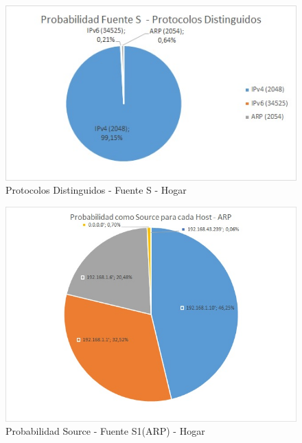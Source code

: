 \begin{figure}[h!]
\centering
\includegraphics[width=\textwidth]{./img/probaS_casa.jpg}
\caption{Protocolos Distinguidos - Fuente S - Hogar}
\end{figure}
\newpage

\begin{figure}[h!]
\centering
\includegraphics[width=\textwidth]{./img/proba_src_casa.jpg}
\caption{Probabilidad Source - Fuente S1(ARP) - Hogar}
\end{figure}

